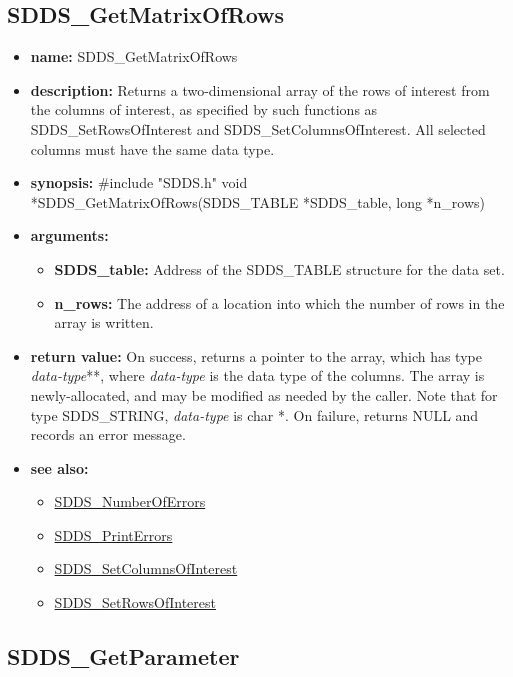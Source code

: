 \documentclass[11pt]{article}
\newcommand{\progref}[1]{\hyperref{SDDS_#1}{{\tt SDDS\_#1} (}{)}{SDDS_#1}}
\begin{document}
\subsection{SDDS\_GetMatrixOfRows}
\label{SDDS_GetMatrixOfRows}

\begin{itemize}
\item {\bf name:}\newline
SDDS\_GetMatrixOfRows
\item {\bf description:}\newline
Returns a two-dimensional array of the rows of interest from the columns of interest, as specified by such functions as SDDS\_SetRowsOfInterest and SDDS\_SetColumnsOfInterest. All selected columns must have the same data type.
\item {\bf synopsis:} \#include "SDDS.h"\newline
void *SDDS\_GetMatrixOfRows(SDDS\_TABLE *SDDS\_table, long *n\_rows)
\item {\bf arguments:}
\begin{itemize}
\item {\bf SDDS\_table:} Address of the SDDS\_TABLE structure for the data set.
\item {\bf n\_rows:} The address of a location into which the number of rows in the array is written.
\end{itemize}
\item {\bf return value:}\newline
On success, returns a pointer to the array, which has type {\em data-type}**, where {\em data-type} is the data type of the columns. The array is newly-allocated, and may be modified as needed by the caller. Note that for type SDDS\_STRING, {\em data-type} is char *.\newline
\newline
On failure, returns NULL and records an error message.
\item {\bf see also:}
\begin{itemize}
\item \progref{NumberOfErrors}
\item \progref{PrintErrors}
\item \progref{SetColumnsOfInterest}
\item \progref{SetRowsOfInterest}
\end{itemize}
\end{itemize}

\subsection{SDDS\_GetParameter}
\label{SDDS_GetParameter}
\end{document}
